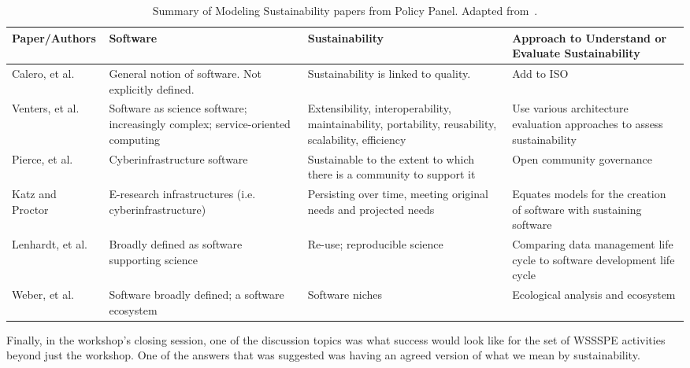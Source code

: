 \documentclass[11pt, oneside]{amsart}
\begin{document}
\begin{table}[t]
  \begin{scriptsize}
    \begin{center}
      \caption{Summary of Modeling Sustainability papers from Policy Panel.  Adapted from~\cite{lenhardt-wssspe1-panel}.}
      \label{tab:defining-sustainability}
      \begin{tabular}{|p{2.3cm}|p{3.6cm}|p{4.4cm}|p{4.8cm}|}
                \hline
{\bf Paper/Authors}
& {\bf Software}
& {\bf Sustainability}
& {\bf Approach to Understand or Evaluate Sustainability} \\
                \hline
Calero, et al.~\cite{Calero_WSSSPE}
& General notion of software. Not explicitly defined.
& Sustainability is linked to quality.
& Add to ISO \\
                \hline
Venters, et al.~\cite{Venters_WSSSPE}
& Software as science software; increasingly complex; service-oriented computing
& Extensibility, interoperability, maintainability, portability, reusability, scalability, efficiency
& Use various architecture evaluation approaches to assess sustainability \\
                \hline
Pierce, et al.~\cite{Pierce_WSSSPE}
& Cyberinfrastructure software
& Sustainable to the extent to which there is a community to support it
& Open community governance \\
                \hline
Katz and Proctor~\cite{Katz_WSSSPE}
& E-research infrastructures (i.e. cyberinfrastructure)
& Persisting over time, meeting original needs and projected needs
& Equates models for the creation of software with sustaining software \\
                \hline
Lenhardt, et al.~\cite{Lenhardt_WSSSPE}
& Broadly defined as software supporting science
& Re-use; reproducible science
& Comparing data management life cycle to software development life cycle \\
                \hline
Weber, et al.~\cite{Weber_WSSSPE}
& Software broadly defined; a software ecosystem
& Software niches
& Ecological analysis and ecosystem \\
                \hline
     \end{tabular}
    \end{center}
  \end{scriptsize}
\end{table}


Finally, in the workshop's closing session, one of the discussion topics was
what success would look like for the set of WSSSPE activities beyond just the workshop.
One of the answers that was suggested was
having an agreed version of what we mean by sustainability.
\end{document}
